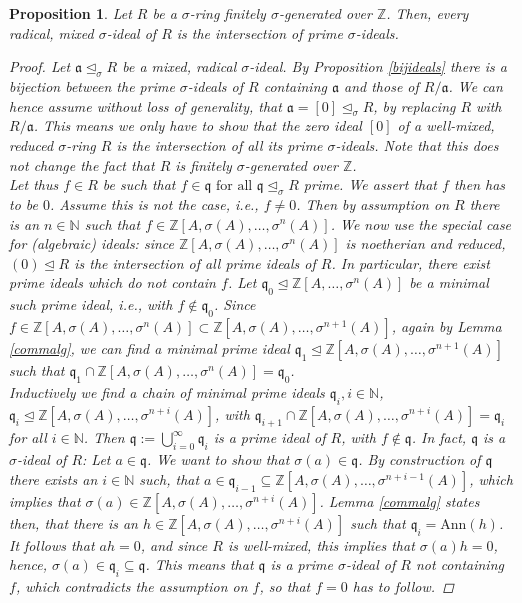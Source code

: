 \documentclass{article}
\def\N{\mathbb{N}}
\def\Z{\mathbb{Z}}
\def\a{\mathfrak{a}}
\def\q{\mathfrak{q}}
\def\s{\sigma}
\def\si{\unlhd_{\sigma}}
\def\fa{\text{ for all }}
\newenvironment{bew}{\begin{proof}[Proof]}{\end{proof}}
\theoremstyle{plain}
\newtheorem{prop}[Satz]{Proposition}
\theoremstyle{definition}
\begin{document}
\begin{prop}\label{mixedintersectionprimesfinite}
Let $R$ be a $\s$-ring finitely $\s$-generated over $\Z$. Then, every radical, mixed $\s$-ideal of $R$ is the intersection of prime $\s$-ideals.
\begin{bew}
Let $\a \si R$ be a mixed, radical $\s$-ideal. By Proposition \ref{bijideals} there is a bijection between the prime $\s$-ideals of $R$ containing $\a$ and those of $R/\a$. We can hence assume without loss of generality, that $\a = [0] \si R$,
 by replacing $R$ with $R/\a$. This means we only have to show that the zero ideal $[0]$ of a well-mixed, reduced $\s$-ring $R$ is the intersection of all its prime $\s$-ideals. Note that this does not change the fact
that $R$ is finitely $\s$-generated over $\Z$. \\
\indent Let thus $f \in R$ be such that $f \in \q \fa \q \si R$ prime. We assert that $f$ then has to be $0$. Assume this is not the case, i.e., $f \neq 0$. Then by assumption on $R$ there is an $n \in \N$ such that $f \in \Z[A,\s(A),\ldots,\s^n(A)]$.
We now use the special case for (algebraic) ideals: since $\Z[A,\s(A),\ldots,\s^n(A)]$ is noetherian and reduced, $(0) \unlhd R$ is the intersection of all prime ideals of $R$. In particular, there exist prime ideals which do not contain $f$.
Let $\q_0 \unlhd \Z[A,\ldots,\s^n(A)]$ be a minimal such prime ideal, i.e., with $f \notin \q_0$. Since $f \in \Z[A,\s(A),\ldots,\s^n(A)] \subset \Z[A,\s(A),\ldots,\s^{n+1}(A)]$, again by Lemma \ref{commalg}, we can find a minimal prime ideal $\q_1 \unlhd \Z[A,\s(A),\ldots,\s^{n+1}(A)]$
such that $\q_1 \cap \Z[A,\s(A),\ldots,\s^{n}(A)] = \q_0$. \\
\indent Inductively we find a chain of minimal prime ideals $\q_i, i \in \N$, $\q_i \unlhd \Z[A,\s(A),\ldots,\s^{n+i}(A)]$, with $\q_{i+1} \cap \Z[A,\s(A),\ldots,\s^{n+i}(A)] = \q_i$ for all $i \in \N$.
Then $\q := \bigcup_{i=0}^{\infty} \q_i$ is a prime ideal of $R$, with $f \notin \q$. In fact, $\q$ is a $\s$-ideal of $R$: Let $a \in \q$. We want to show that $\s(a) \in \q$. By construction of $\q$ there exists an $i \in \N$ such,
that $a \in \q_{i-1} \subseteq \Z[A,\s(A),\ldots,\s^{n+i-1}(A)]$, which implies that $\s(a) \in \Z[A,\s(A),\ldots,\s^{n+i}(A)]$. Lemma \ref{commalg} states then, that there is an $h \in \Z[A,\s(A),\ldots,\s^{n+i}(A)]$ such that $ \q_i = \text{Ann}(h)$.
It follows that $ah = 0$, and since $R$ is well-mixed, this implies that $\s(a)h = 0$, hence, $\s(a) \in \q_i \subseteq \q$. This means that $\q$ is a prime $\s$-ideal of $R$ not containing $f$, which contradicts the assumption on $f$, so that $f = 0$ has to follow.
\end{bew}
\end{prop}
\end{document}
